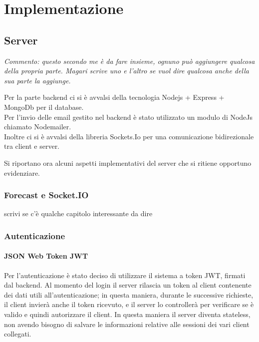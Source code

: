 

\chapter{Implementazione}
\section{Server}
\textit{Commento: questo secondo me è da fare insieme, ognuno può aggiungere qualcosa della propria parte. Magari scrive uno e l'altro se vuol dire qualcosa anche della sua parte la aggiunge.}

Per la parte backend ci si è avvalsi della tecnologia Nodejs + Express + MongoDb per il database.\\
Per l'invio delle email gestito nel backend è stato utilizzato un modulo di NodeJs chiamato Nodemailer.\\
Inoltre ci si è avvalsi della libreria Sockets.Io per una comunicazione bidirezionale tra client e server.

Si riportano ora alcuni aspetti implementativi del server che si ritiene opportuno evidenziare. 
\subsection{Forecast e Socket.IO}
scrivi se c'è qualche capitolo interessante da dire

\subsection{Autenticazione}

\subsubsection{JSON Web Token JWT}
Per l'autenticazione è stato deciso di utilizzare il sistema a token JWT, firmati dal backend. Al momento
del login il server rilascia un token al client contenente dei dati
utili all’autenticazione; in questa maniera, durante le successive richieste,
il client invierà anche il token ricevuto, e il server lo controllerà per verificare
se è valido e quindi autorizzare il client. In questa maniera il server
diventa stateless, non avendo bisogno di salvare le informazioni relative
alle sessioni dei vari client collegati.


